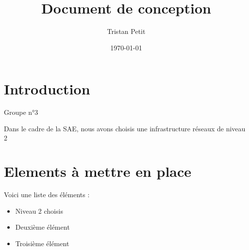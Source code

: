 \documentclass{article}
\begin{document}
\title{Document de conception}
\author{Tristan Petit}
\date{\today}
\maketitle

\section{Introduction}
Groupe n°3 

Dans le cadre de la SAE, nous avons choisis une infrastructure réseaux 
de niveau 2


\section{Elements à mettre en place}
Voici une liste des éléments :
\begin{itemize}
    \item Niveau 2 choisis
    \item Deuxième élément
    \item Troisième élément
\end{itemize}
\end{document}
